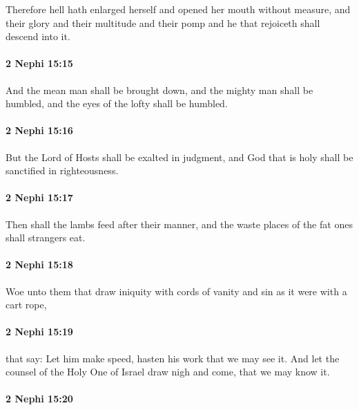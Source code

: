 			Therefore hell hath enlarged herself and opened her mouth without measure,
			and their glory and their multitude and their pomp and he that rejoiceth
			shall descend into it.

		\paragraph{2 Nephi 15:15} %
			\label{2NEPHI-15-15}

			And the mean man shall be brought down,
			and the mighty man shall be humbled,
			and the eyes of the lofty shall be humbled.

		\paragraph{2 Nephi 15:16} %
			\label{2NEPHI-15-16}

			But the Lord of Hosts shall be exalted in judgment,
			and God that is holy shall be sanctified in righteousness.

		\paragraph{2 Nephi 15:17} %
			\label{2NEPHI-15-17}

			Then shall the lambs feed after their manner,
			and the waste places of the fat ones shall strangers eat.

		\paragraph{2 Nephi 15:18} %
			\label{2NEPHI-15-18}

			Woe unto them that draw iniquity with cords of vanity
			and sin as it were with a cart rope,

		\paragraph{2 Nephi 15:19} %
			\label{2NEPHI-15-19}

			that say:
			Let him make speed,
			hasten his work that we may see it.
			And let the counsel of the Holy One of Israel draw nigh and come,
			that we may know it.

		\paragraph{2 Nephi 15:20} %
			\label{2NEPHI-15-20}

